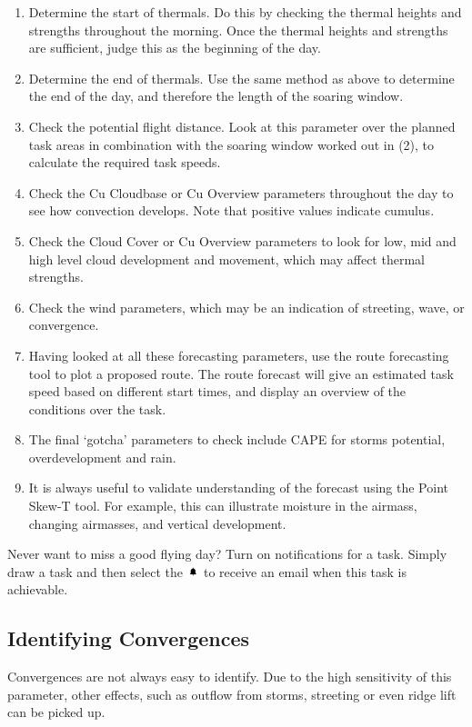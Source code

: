 \documentclass[11pt,a4paper]{article}
\begin{document}
\begin{enumerate}
\item Determine the start of thermals. Do this by checking the thermal heights and strengths throughout the morning. Once the thermal heights and strengths are sufficient, judge this as the beginning of the day.
\item Determine the end of thermals. Use the same method as above to determine the end of the day, and therefore the length of the soaring window.
\item Check the potential flight distance. Look at this parameter over the planned task areas in combination with the soaring window worked out in (2), to calculate the required task speeds.
\item Check the Cu Cloudbase or Cu Overview parameters throughout the day to see how convection develops. Note that positive values indicate cumulus.
\item Check the Cloud Cover or Cu Overview parameters to look for low, mid and high level cloud development and movement, which may affect thermal strengths.
\item Check the wind parameters, which may be an indication of streeting, wave, or convergence.
\item Having looked at all these forecasting parameters, use the route forecasting tool to plot a proposed route. The route forecast will give an estimated task speed based on different start times, and display an overview of the conditions over the task.
\item The final `gotcha' parameters to check include CAPE for storms potential, overdevelopment and rain.
\item It is always useful to validate understanding of the forecast using the Point Skew-T tool. For example, this can illustrate moisture in the airmass, changing airmasses, and vertical development.
\end{enumerate}

\begin{tip}
\item Never want to miss a good flying day? Turn on notifications for a task. Simply draw a task and then select the \includegraphics[height=9pt]{images/icons/bell.png} to receive an email when this task is achievable.
\end{tip}

\subsection{Identifying Convergences}
Convergences are not always easy to identify. Due to the high sensitivity of this parameter, other effects, such as outflow from storms, streeting or even ridge lift can be picked up. 
\end{document}
